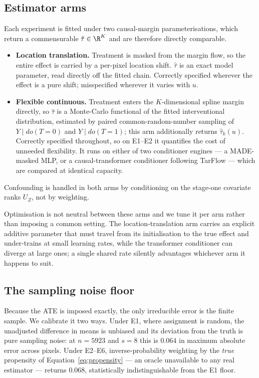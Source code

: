 \subsection{Estimator arms}
\label{sec:arms}

Each experiment is fitted under two causal-margin parameterisations, which return a
commensurable $\hat{\tau} \in \R^K$ and are therefore directly comparable.

\begin{itemize}
    \item \textbf{Location translation.} Treatment is masked from the margin flow, so the
    entire effect is carried by a per-pixel location shift. $\hat{\tau}$ is an exact model
    parameter, read directly off the fitted chain. Correctly specified wherever the effect is
    a pure shift; misspecified wherever it varies with $u$.

    \item \textbf{Flexible continuous.} Treatment enters the $K$-dimensional spline margin
    directly, so $\hat{\tau}$ is a Monte-Carlo functional of the fitted interventional
    distribution, estimated by paired common-random-number sampling of $Y \mid do(T=0)$ and
    $Y \mid do(T=1)$; this arm additionally returns $\hat{\tau}_k(u)$. Correctly specified
    throughout, so on E1--E2 it quantifies the cost of unneeded flexibility. It runs on either
    of two conditioner engines --- a MADE-masked MLP, or a causal-transformer conditioner
    following TarFlow --- which are compared at identical capacity.
\end{itemize}

Confounding is handled in both arms by conditioning on the stage-one covariate ranks $U_Z$,
not by weighting.

Optimisation is not neutral between these arms and we tune it per arm rather than imposing a
common setting. The location-translation arm carries an explicit additive parameter that must
travel from its initialisation to the true effect and under-trains at small learning rates,
while the transformer conditioner can diverge at large ones; a single shared rate silently
advantages whichever arm it happens to suit.

\subsection{The sampling noise floor}
\label{sec:floor}

Because the ATE is imposed exactly, the only irreducible error is the finite sample. We
calibrate it two ways. Under E1, where assignment is random, the unadjusted difference in
means is unbiased and its deviation from the truth is pure sampling noise: at $n = 5923$ and
$s = 8$ this is $0.064$ in maximum absolute error across pixels. Under E2--E6,
inverse-probability weighting by the \emph{true} propensity of
Equation~\eqref{eq:propensity} --- an oracle unavailable to any real estimator --- returns
$0.068$, statistically indistinguishable from the E1 floor.

